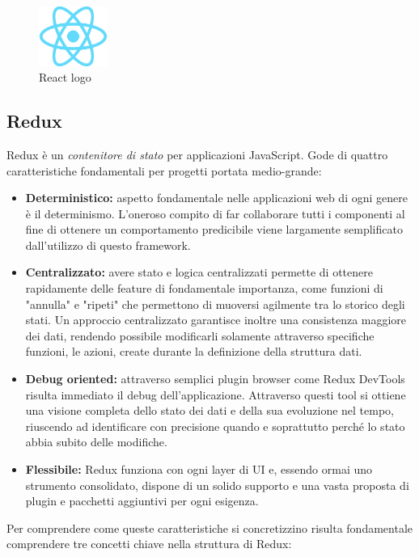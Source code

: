 \begin{figure}[H]
\centering
\includegraphics[width=0.2\textwidth]{img/logos/react_logo.png}
\caption{React logo}
\label{fig:react}
\end{figure}


\subsection{Redux}

Redux \cite{caratteristiche_redux} è un \emph{contenitore di stato} per applicazioni JavaScript. Gode di quattro caratteristiche fondamentali per progetti portata medio-grande:
\begin{itemize}
  \item \textbf{Deterministico:} aspetto fondamentale nelle applicazioni web di ogni genere è il determinismo. L'oneroso compito di far collaborare tutti i componenti al fine di ottenere un comportamento predicibile viene largamente semplificato dall'utilizzo di questo framework.
  \item \textbf{Centralizzato:} avere stato e logica centralizzati permette di ottenere rapidamente delle feature di fondamentale importanza, come funzioni di "annulla" e "ripeti" che permettono di muoversi agilmente tra lo storico degli stati. Un approccio centralizzato garantisce inoltre una consistenza maggiore dei dati, rendendo possibile modificarli solamente attraverso specifiche funzioni, le azioni, create durante la definizione della struttura dati.
  \item \textbf{Debug oriented:} attraverso semplici plugin browser come Redux DevTools risulta immediato il debug dell'applicazione. Attraverso questi tool si ottiene una visione completa dello stato dei dati e della sua evoluzione nel tempo, riuscendo ad identificare con precisione quando e soprattutto perché lo stato abbia subito delle modifiche.
  \item \textbf{Flessibile:} Redux funziona con ogni layer di UI e, essendo ormai uno strumento consolidato, dispone di un solido supporto e una vasta proposta di plugin e pacchetti aggiuntivi per ogni esigenza.
\end{itemize}
Per comprendere come queste caratteristiche si concretizzino risulta fondamentale comprendere tre concetti chiave nella struttura di Redux:
